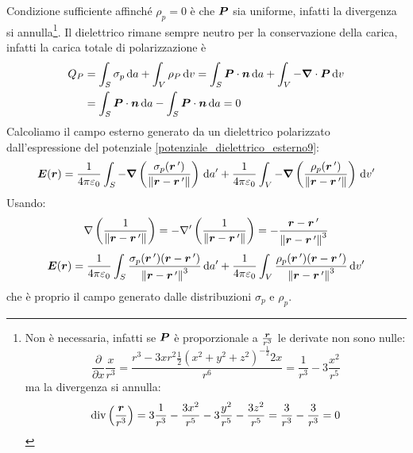 Condizione sufficiente affinché $\rho_p=0$ è che $\boldsymbol{P}$ sia uniforme, infatti la divergenza si annulla\footnote{
Non è necessaria, infatti se $\boldsymbol{P}$ è proporzionale a $\frac{\boldsymbol{r}}{r^3}$ le derivate non sono nulle:
\[
  \frac{\partial}{\partial x} \frac{x}{r^3}=\frac{r^3-3xr^2\frac{1}{2}\left(x^2+y^2+z^2\right)^{-\frac{1}{2}}2x}{r^6}=\frac{1}{r^3}-3\frac{x^2}{r^5}
\]
ma la divergenza si annulla:
\[
  \operatorname{div}\left(\frac{\boldsymbol{r}}{r^3}\right)=3\frac{1}{r^3}-\frac{3x^2}{r^5}-3\frac{y^2}{r^5}-\frac{3z^2}{r^5}=\frac{3}{r^3}-\frac{3}{r^3}=0
\]
}.
Il dielettrico rimane sempre neutro per la conservazione della carica, infatti la carica totale di polarizzazione è
\begin{equation}
  \begin{split}
    Q_P&=\int_S\sigma_p\,\mathrm{d} a+\int_V\rho_P\,\mathrm{d} v=\int_S\boldsymbol{P}\cdot\boldsymbol{n}\,\mathrm{d} a+\int_V-\boldsymbol{\nabla}\cdot\boldsymbol{P}\,\mathrm{d} v\\
    &=\int_S\boldsymbol{P}\cdot\boldsymbol{n}\,\mathrm{d} a-\int_S\boldsymbol{P}\cdot\boldsymbol{n}\,\mathrm{d} a=0
  \end{split}
\end{equation}
Calcoliamo il campo esterno generato da un dielettrico polarizzato dall'espressione del potenziale \eqref{potenziale_dielettrico_esterno9}:
\begin{equation}
  \boldsymbol{E}(\boldsymbol{r})=\frac{1}{4\pi\varepsilon_0}\int_S-\boldsymbol{\nabla}\left(\frac{\sigma_p(\boldsymbol{r}\,')}{\left\lVert\boldsymbol{r}-\boldsymbol{r}\,'\right\rVert}\right)\,\mathrm{d} a'+\frac{1}{4\pi\varepsilon_0}\int_V-\boldsymbol{\nabla}\left(\frac{\rho_p(\boldsymbol{r}\,')}{\left\lVert\boldsymbol{r}-\boldsymbol{r}\,'\right\rVert}\right)\,\mathrm{d} v'
\end{equation}
Usando:
\[
  \nabla\left(\frac{1}{\left\lVert\boldsymbol{r}-\boldsymbol{r}\,'\right\rVert}\right)=-\nabla'\left(\frac{1}{\left\lVert\boldsymbol{r}-\boldsymbol{r}\,'\right\rVert}\right)=-\frac{\boldsymbol{r}-\boldsymbol{r}\,'}{\left\lVert\boldsymbol{r}-\boldsymbol{r}\,'\right\rVert^3}
\]
\begin{equation}
  \boldsymbol{E}(\boldsymbol{r})=\frac{1}{4\pi\varepsilon_0}\int_S\frac{\sigma_p(\boldsymbol{r}\,')(\boldsymbol{r}-\boldsymbol{r}\,')}{\left\lVert\boldsymbol{r}-\boldsymbol{r}\,'\right\rVert^3}\,\mathrm{d} a'+\frac{1}{4\pi\varepsilon_0}\int_V\frac{\rho_p(\boldsymbol{r}\,')(\boldsymbol{r}-\boldsymbol{r}\,')}{\left\lVert\boldsymbol{r}-\boldsymbol{r}\,'\right\rVert^3}\,\mathrm{d} v'
  \label{campo_elettrico_esterno_dielettrico}
\end{equation}
che è proprio il campo generato dalle distribuzioni $\sigma_p$ e $\rho_p$.

